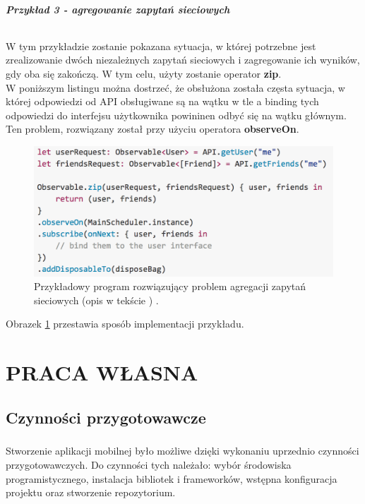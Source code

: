 \documentclass[12pt,oneside,a4paper]{report}
\begin{document}
\paragraph{Przykład 3 - agregowanie zapytań sieciowych}
\subparagraph{}W tym przykładzie zostanie pokazana sytuacja, w której potrzebne jest zrealizowanie dwóch niezależnych zapytań sieciowych i zagregowanie ich wyników, gdy oba się zakończą. W tym celu, użyty zostanie operator \textbf{zip}.\\
W poniższym listingu można dostrzeć, że obsłużona została częsta sytuacja, w której odpowiedzi od API obsługiwane są na wątku w tle a binding tych odpowiedzi do interfejsu użytkownika powininen odbyć się na wątku głównym. Ten problem, rozwiązany został przy użyciu operatora \textbf{observeOn}.
\begin{figure}[ht!]
	\centering
	\includegraphics[width=14cm]{aggregatingNetworkRequests}
	\caption{Przykładowy program rozwiązujący problem agregacji zapytań sieciowych (opis w tekście ) \cite{transientState}.}
	\label{aggregatingNetworkRequests}
\end{figure}
Obrazek \ref{aggregatingNetworkRequests} przestawia sposób implementacji przykładu.
\chapter{PRACA WŁASNA}
\section{Czynności przygotowawcze}		
\paragraph{}Stworzenie aplikacji mobilnej było możliwe dzięki wykonaniu uprzednio czynności przygotowawczych. Do czynności tych należało: wybór środowiska programistycznego, instalacja bibliotek i frameworków, wstępna konfiguracja projektu oraz stworzenie repozytorium.
\end{document}
